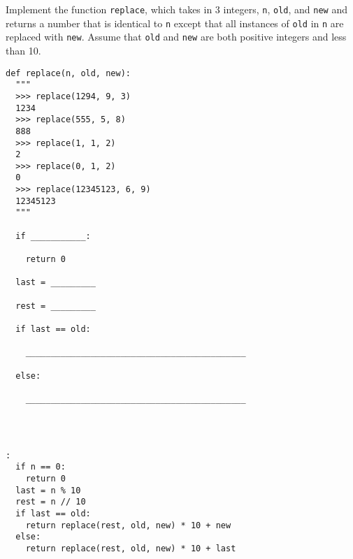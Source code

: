 \begin{blocksection}
\question Implement the function \texttt{replace}, which takes in 3 integers, \texttt{n}, \texttt{old}, and \texttt{new} and returns a number that is identical to \texttt{n} except that all instances of \texttt{old} in \texttt{n} are replaced with \texttt{new}. Assume that \texttt{old} and \texttt{new} are both positive integers and less than 10.

\begin{lstlisting}
def replace(n, old, new): 
  """ 
  >>> replace(1294, 9, 3)
  1234
  >>> replace(555, 5, 8)
  888
  >>> replace(1, 1, 2)
  2
  >>> replace(0, 1, 2)
  0
  >>> replace(12345123, 6, 9)
  12345123
  """
	
  if ___________:
	
    return 0
		
  last = _________
	
  rest = _________
	
  if last == old:
	
    ____________________________________________
		
  else:
	
    ____________________________________________


				
\end{lstlisting}
\end{blocksection}
\begin{blocksection}

\begin{solution}[.25in]
\begin{lstlisting}:
  if n == 0:
    return 0		
  last = n % 10
  rest = n // 10
  if last == old:
    return replace(rest, old, new) * 10 + new	
  else:
    return replace(rest, old, new) * 10 + last
\end{lstlisting}
\end{solution}
\end{blocksection}
